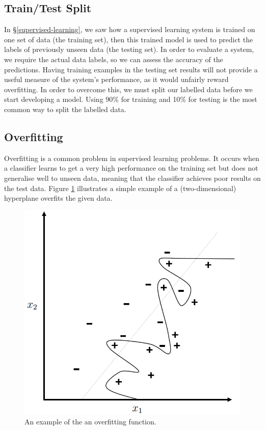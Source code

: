 \documentclass[12pt,a4paper,twoside,openright]{report}
\begin{document}
\subsection{Train/Test Split} \label{train-test-split}
In \S\ref{supervised-learning}, we saw how a supervised learning system is trained on one set of data (the training set), then this trained model is used to predict the labels of previously unseen data (the testing set). In order to evaluate a system, we require the actual data labels, so we can assess the accuracy of the predictions. Having training examples in the testing set results will not provide a useful measure of the system's performance, as it would unfairly reward overfitting. In order to overcome this, we must split our labelled data before we start developing a model. Using 90\% for training and 10\% for testing is the most common way to split the labelled data.
\subsection{Overfitting} \label{prep-overfitting}

Overfitting is a common problem in supervised learning problems. It occurs when a classifier learns to get a very high performance on the training set but does not generalise well to unseen data, meaning that the classifier achieves poor results on the test data. Figure \ref{fig:overfitting} illustrates a simple example of a (two-dimensional) hyperplane overfits the given data.
\begin{figure}
	\begin{center}
		\includegraphics[scale=0.6]{figs/overfitting.png}
	\end{center}
	\caption{An example of the an overfitting function.}
	\label{fig:overfitting}
\end{figure}
\end{document}
